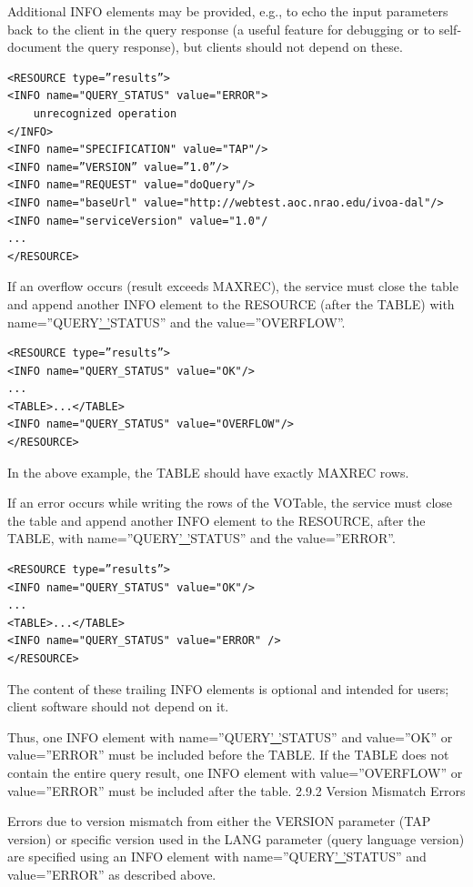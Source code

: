 \documentclass[11pt,a4paper]{ivoa}
\begin{document}
{Additional INFO elements may be provided, e.g., to echo the input parameters 
back to the client in the query response (a useful feature for debugging or to 
self-document the query response), but clients should not depend on these. 

\begin{verbatim}
<RESOURCE type=”results”>
<INFO name="QUERY_STATUS" value="ERROR">
    unrecognized operation
</INFO>
<INFO name="SPECIFICATION" value="TAP"/>
<INFO name=”VERSION” value=”1.0”/>
<INFO name="REQUEST" value="doQuery"/>
<INFO name="baseUrl" value="http://webtest.aoc.nrao.edu/ivoa-dal"/>
<INFO name="serviceVersion" value="1.0"/
...
</RESOURCE>
\end{verbatim}

If an overflow occurs (result exceeds MAXREC), the service must close the table 
and append another INFO element to the RESOURCE (after the TABLE) with 
name=”QUERY\underline{' '}STATUS” and the value=”OVERFLOW”.
\begin{verbatim}
<RESOURCE type=”results”>
<INFO name="QUERY_STATUS" value="OK"/>
...
<TABLE>...</TABLE>
<INFO name="QUERY_STATUS" value="OVERFLOW"/>
</RESOURCE>
\end{verbatim}

In the above example, the TABLE should have exactly MAXREC rows.

If an error occurs while writing the rows of the VOTable, the service must 
close the table and append another INFO element to the RESOURCE, after the 
TABLE, with name=”QUERY\underline{' '}STATUS” and the value=”ERROR”.
\begin{verbatim}
<RESOURCE type=”results”>
<INFO name="QUERY_STATUS" value="OK"/>
...
<TABLE>...</TABLE>
<INFO name="QUERY_STATUS" value="ERROR" />
</RESOURCE>
\end{verbatim}
The content of these trailing INFO elements is optional and intended for users; 
client software should not depend on it.

Thus, one INFO element with name=”QUERY\underline{' '}STATUS” and value=”OK” or 
value=”ERROR” must be included before the TABLE. If the TABLE does not contain 
the entire query result, one INFO element with value=”OVERFLOW” or 
value=”ERROR” 
 must be included after the table.
2.9.2 Version Mismatch Errors

Errors due to version mismatch from either the VERSION parameter (TAP version) 
or specific version used in the LANG parameter (query language version) are 
specified using an INFO element with name=”QUERY\underline{' '}STATUS” and 
value=”ERROR” as described above.  

}
\end{document}
